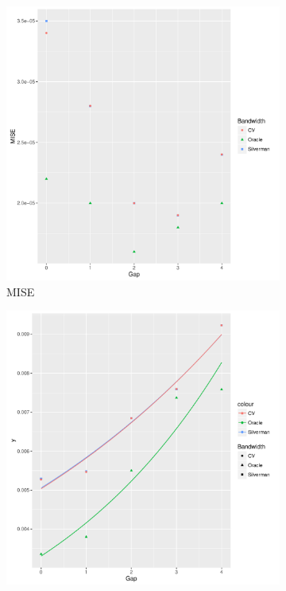 \begin{figure}[htbp]
    \centering
    \begin{subfigure}[b]{0.3\textwidth}
    \includegraphics[width=\textwidth]{results/by_two_peaks/MISE-vs-risk-peak-gap}
    \caption{MISE}
    \end{subfigure}
    \begin{subfigure}[b]{0.3\textwidth}
    \includegraphics[width=\textwidth]{results/by_two_peaks/RMISE-vs-risk-peak-gap}

\end{subfigure}
\end{figure}
